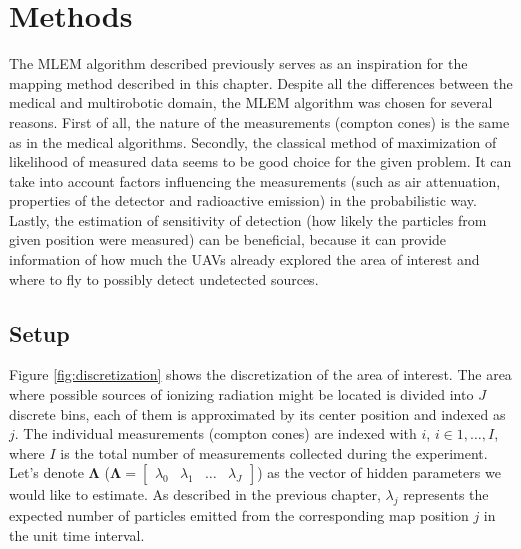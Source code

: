 \chapter{Methods}
The \ac{MLEM} algorithm described previously serves as an inspiration for the mapping method described in this chapter.
Despite all the differences between the medical and multirobotic domain, the \ac{MLEM} algorithm was chosen for several reasons.
First of all, the nature of the measurements (compton cones) is the same as in the medical algorithms.
Secondly, the classical method of maximization of likelihood of measured data seems to be good choice for the given problem.
It can take into account factors influencing the measurements (such as air attenuation, properties of the detector and radioactive emission) in the probabilistic way.
Lastly, the estimation of sensitivity of detection (how likely the particles from given position were measured) can be beneficial, 
because it can provide information of how much the \ac{UAV}s already explored the area of interest and where to fly to possibly detect undetected sources.



\section{Setup}
Figure \ref{fig:discretization} shows the discretization of the area of interest.
The area where possible sources of ionizing radiation might be located is divided into $J$ discrete bins, each of them is approximated by its center position and indexed as $j$.
The individual measurements (compton cones) are indexed with $i$, $i \in 1, \dots , I$, where $I$ is the total number of measurements collected during the experiment.
Let's denote $\mathbf{\Lambda}$ ($\mathbf{\Lambda} = \begin{bmatrix}\lambda_{0} & \lambda_{1} & \dots & \lambda_{J}\end{bmatrix}$) as the vector of hidden parameters we would like to estimate.
As described in the previous chapter, $\lambda_{j}$ represents the expected number of particles emitted from the corresponding map position $j$ in the unit time interval.


